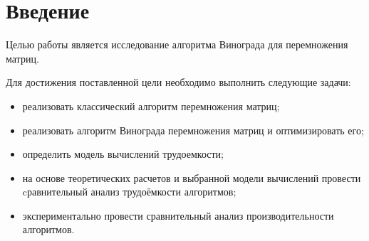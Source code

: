 \chapter*{Введение}


Целью работы является исследование алгоритма Винограда для перемножения матриц.

Для достижения поставленной цели необходимо выполнить следующие задачи:
\begin{itemize}
	\item реализовать классический алгоритм перемножения матриц;
	\item реализовать алгоритм Винограда перемножения матриц и оптимизировать его;
	\item определить модель вычислений трудоемкости;
	\item на основе теоретических расчетов и выбранной модели вычислений провести cравнительный анализ трудоёмкости алгоритмов;
	\item экспериментально провести сравнительный анализ производительности алгоритмов.
\end{itemize}




